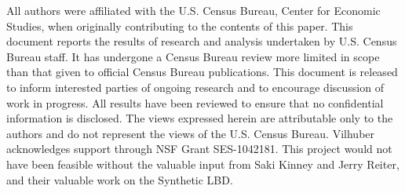 
All authors were affiliated with the U.S. Census Bureau, Center for Economic Studies, when originally contributing to the contents of this paper. 
This document reports the results of research and analysis
undertaken by U.S. Census Bureau staff. It has undergone a Census
Bureau review more limited in scope than that given to official Census
Bureau publications. This document is released to inform interested
parties of ongoing research and to encourage discussion of work in
progress. All results have been reviewed to ensure that no confidential information is
disclosed. The views expressed herein are attributable only to the
authors and do not represent the views of the U.S. Census Bureau. 
Vilhuber acknowledges support through NSF Grant SES-1042181. 
This project would not have been feasible without the valuable input from Saki Kinney and Jerry 
Reiter, and their valuable work on the Synthetic LBD.

